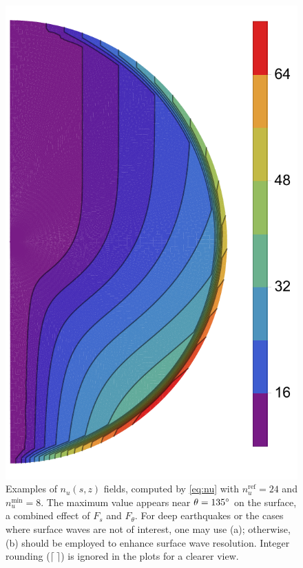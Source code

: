 \documentclass[extra,referee]{gji}
\begin{document}
\begin{figure}
\begin{minipage}{0.3\textwidth}
    \includegraphics[width=\textwidth]{fig/nu24/ys.pdf}
  \end{minipage}
  \caption{Examples of $n_u\left(s,z\right)$ fields, computed by 
  \eqref{eq:nu} with $n_u^\text{ref}=24$ and $n_u^\text{min}=8$. 
  The maximum value appears near $\theta=135\hbox{$^\circ$}$ on the surface,
  a combined effect of $F_s$ and $F_\theta$. For deep earthquakes or 
  the cases where surface waves are not of interest, one may use (a); 
  otherwise, (b) should be employed to enhance surface wave resolution.
  Integer rounding ($\lceil\ \rceil$) is ignored in 
  the plots for a clearer view.} 
  \label{fig:nu}
\end{figure}
\end{document}
